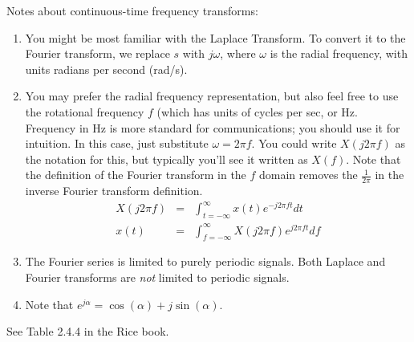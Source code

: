 Notes about continuous-time frequency transforms:
\begin{enumerate}
 \item You might be most familiar with the Laplace Transform.  To convert it to the Fourier transform, we replace $s$ with $j \omega$, where   $\omega$ is the radial frequency, with units radians per second (rad/s).
 \item You may prefer the radial frequency representation, but also feel free to use the rotational frequency $f$ (which has units of cycles per sec, or Hz.  Frequency in Hz is more standard for communications; you should use it for intuition.  In this case, just substitute $\omega = 2\pi f$.  You could write $X(j2\pi f)$ as the notation for this, but typically you'll see it written as $X(f)$.  Note that the definition of the Fourier transform in the $f$ domain removes the $\frac{1}{2\pi}$ in the inverse Fourier transform definition.
   \begin{eqnarray}
     X(j2\pi f) &=& \int_{t=-\infty}^\infty x(t) e^{-j 2\pi f t} dt \nonumber \\
     x(t) &=&  \int_{f=-\infty}^\infty X(j2\pi f) e^{j2\pi f t} df \nonumber 
   \end{eqnarray}
 \item The Fourier series is limited to purely periodic signals.  Both Laplace and Fourier transforms are \textit{not} limited to periodic signals.
 \item Note that $e^{j\alpha} = \cos(\alpha) + j \sin(\alpha)$.
\end{enumerate}

See Table 2.4.4 in the Rice book.

